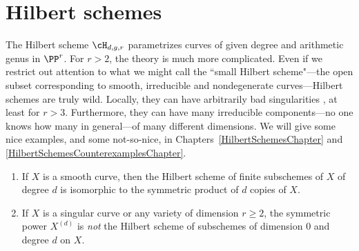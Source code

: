 \section{Hilbert schemes}\label{hilbert scheme section}



The Hilbert scheme $\cH_{d,g,r}$ parametrizes curves of given degree and arithmetic genus in $\PP^r$. For $r>2$, the theory is much more complicated.  Even if we restrict out attention to  what we might call the ``small Hilbert scheme"---the open subset corresponding to smooth, irreducible and nondegenerate curves---Hilbert schemes are truly wild. Locally, they can have arbitrarily bad singularities \cite{MR2227692}, at least for $r>3$. Furthermore, they can have many irreducible components---no one knows how many in general---of many different dimensions. We will give some nice examples, and some not-so-nice, in Chapters~\ref{HilbertSchemesChapter} and \ref{HilbertSchemesCounterexamplesChapter}.

\begin{exercise}\label{symmetric power vs Hilbert scheme}
\begin{enumerate}
 \item If $X$ is a smooth curve, then the Hilbert scheme of finite subschemes of $X$ of degree $d$ is
 isomorphic to the symmetric product of $d$ copies of $X$.
 \item If $X$ is a singular curve or any variety of dimension $r \geq 2$, the symmetric power $X^{(d)}$ is \emph{not} the Hilbert scheme of subschemes of dimension 0 and degree $d$ on $X$. 
\end{enumerate}
 \end{exercise}

